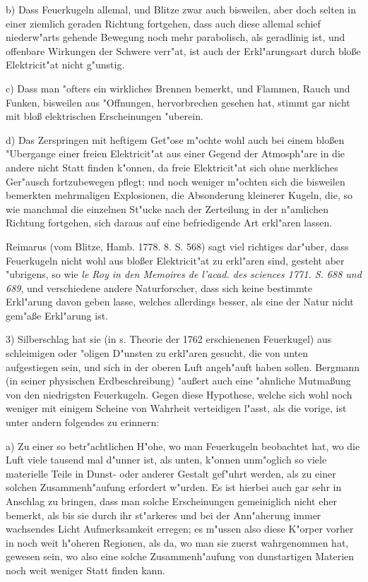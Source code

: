 \documentclass[a4paper, 11pt, oneside, polutonikogreek, german]{article}
\begin{document}
b) Dass Feuerkugeln allemal, und Blitze zwar auch bisweilen, aber doch selten in einer ziemlich geraden Richtung fortgehen, dass auch diese allemal schief niederw"arts gehende Bewegung noch mehr parabolisch, als geradlinig ist, und offenbare Wirkungen der Schwere verr"at, ist auch der Erkl"arungsart durch bloße Elektricit"at nicht g"unstig.

c) Dass man "ofters ein wirkliches Brennen bemerkt, und Flammen, Rauch und Funken, bisweilen aus "Offnungen, hervorbrechen gesehen hat, stimmt gar nicht mit bloß elektrischen Erscheinungen "uberein.

d) Das Zerspringen mit heftigem Get"ose m"ochte wohl auch bei einem bloßen "Ubergange einer freien Elektricit"at aus einer Gegend der Atmosph"are in die andere nicht Statt finden k"onnen, da freie Elektricit"at sich ohne merkliches Ger"ausch fortzubewegen pflegt; und noch weniger m"ochten sich die bisweilen bemerkten mehrmaligen Explosionen, die Absonderung kleinerer Kugeln, die, so wie manchmal die einzelnen St"ucke nach der Zerteilung in der n"amlichen Richtung fortgehen, sich daraus auf eine befriedigende Art erkl"aren lassen.

Reimarus (vom Blitze, Hamb. 1778. 8. S. 568) sagt viel richtiges dar"uber, dass Feuerkugeln nicht wohl aus bloßer Elektricit"at zu erkl"aren sind, gesteht aber "ubrigens, so wie \emph{le Roy in den Memoires de l'acad. des sciences 1771. S. 688 und 689}, und verschiedene andere Naturforscher, dass sich keine bestimmte Erkl"arung davon geben lasse, welches allerdings besser, als eine der Natur nicht gem"aße Erkl"arung ist.

3) Silberschlag hat sie (in s. Theorie der 1762 erschienenen Feuerkugel) aus schleimigen oder "oligen D"unsten zu erkl"aren gesucht, die von unten aufgestiegen sein, und sich in der oberen Luft angeh"auft haben sollen. Bergmann (in seiner physischen Erdbeschreibung) "außert auch eine "ahnliche Mutmaßung von den niedrigsten Feuerkugeln. Gegen diese Hypothese, welche sich wohl noch weniger mit einigem Scheine von Wahrheit verteidigen l"asst, als die vorige, ist unter andern folgendes zu erinnern:

a) Zu einer so betr"achtlichen H"ohe, wo man Feuerkugeln beobachtet hat, wo die Luft viele tausend mal d"unner ist, als unten, k"onnen unm"oglich so viele materielle Teile in Dunst- oder anderer Gestalt gef"uhrt werden, als zu einer solchen Zusammenh"aufung erfordert w"urden. Es ist hierbei auch gar sehr in Anschlag zu bringen, dass man solche Erscheinungen gemeiniglich nicht eher bemerkt, als bis sie durch ihr st"arkeres und bei der Ann"aherung immer wachsendes Licht Aufmerksamkeit erregen; es m"ussen also diese K"orper vorher in noch weit h"oheren Regionen, als da, wo man sie zuerst wahrgenommen hat, gewesen sein, wo also eine solche Zusammenh"aufung von dunstartigen Materien noch weit weniger Statt finden kann.
\end{document}
